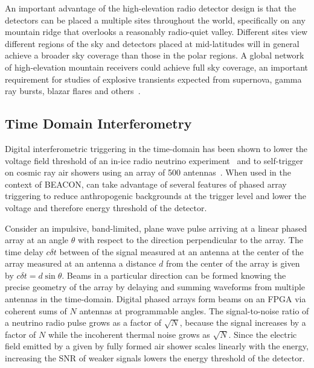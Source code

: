 \documentclass{PoS}
\begin{document}
An important advantage of the high-elevation radio detector design is that the detectors can be placed a multiple sites throughout the world, specifically on any mountain ridge that overlooks a reasonably radio-quiet valley. Different sites view different regions of the sky and detectors placed at mid-latitudes will in general achieve a broader sky coverage than those in the polar regions. A global network of high-elevation mountain receivers could achieve full sky coverage, an important requirement for studies of explosive transients expected from supernova, gamma ray bursts, blazar flares and others~\cite{astro_decadal}.

\subsection{Time Domain Interferometry} 

Digital interferometric triggering in the time-domain has been shown to lower the voltage field threshold of an in-ice radio neutrino experiment~\cite{oberla_ara_pa} and to self-trigger on cosmic ray air showers using an array of 500 antennas~\cite{ryan_monroe}. When used in the context of BEACON, can take advantage of several features of phased array triggering to reduce anthropogenic backgrounds at the trigger level and lower the voltage and therefore energy threshold of the detector.

Consider an impulsive, band-limited, plane wave pulse arriving at a linear phased array at an angle $\theta$ with respect to the direction perpendicular to the array. The time delay $c \delta t$ between of the signal measured at an antenna at the center of the array measured at an antenna a distance $d$ from the center of the array is given by $c \delta t = d \sin \theta$. Beams in a particular direction can be formed knowing the precise geometry of the array by delaying and summing waveforms from multiple antennas in the time-domain. Digital phased arrays form beams on an FPGA via coherent sums of $N$ antennas at programmable angles. The signal-to-noise ratio of a neutrino radio pulse grows as a factor of $\sqrt{N}$, because the signal increases by a factor of $N$ while the incoherent thermal noise grows as $\sqrt{N}$. Since the electric field emitted by a given by fully formed air shower scales linearly with the energy, increasing the SNR of weaker signals lowers the energy threshold of the detector. 
\end{document}

